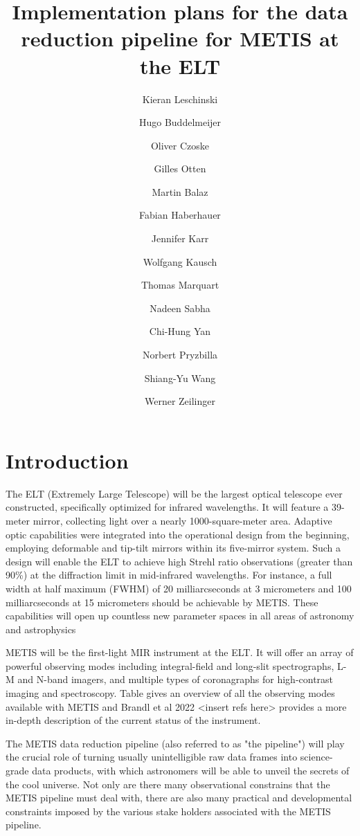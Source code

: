 \documentclass[a4paper]{spie}  %
\title{Implementation plans for the data reduction pipeline for METIS at the ELT}
\author[a]{Kieran Leschinski}
\author[a]{Hugo Buddelmeijer}
\author[a]{Oliver Czoske}
\author[b]{Gilles Otten}
\author[a]{Martin Balaz}
\author[a]{Fabian Haberhauer}
\author[b]{Jennifer Karr}
\author[c]{Wolfgang Kausch}
\author[d]{Thomas Marquart}
\author[c]{Nadeen Sabha}
\author[b]{Chi-Hung Yan}
\author[c]{Norbert Pryzbilla}
\author[b]{Shiang-Yu Wang}
\author[a]{Werner Zeilinger}
\affil[a]{University of Vienna, T\"urkenschanztra\ss e 18, 1180 Vienna, Austria}
\affil[b]{ASIAA, Taiwan}
\affil[c]{University of Innsbruck, Austria}
\affil[d]{University of Uppsala, Sweden}
\begin{document}
 
\maketitle

\begin{abstract}


\end{abstract}



\section{Introduction}
The ELT (Extremely Large Telescope) will be the largest optical telescope ever constructed, specifically optimized for infrared wavelengths. 
It will feature a 39-meter mirror, collecting light over a nearly 1000-square-meter area. 
Adaptive optic capabilities were integrated into the operational design from the beginning, employing deformable and tip-tilt mirrors within its five-mirror system. 
Such a design will enable the ELT to achieve high Strehl ratio observations (greater than 90\%) at the diffraction limit in mid-infrared wavelengths. 
For instance, a full width at half maximum (FWHM) of 20 milliarcseconds at 3 micrometers and 100 milliarcseconds at 15 micrometers should be achievable by METIS. 
These capabilities will open up countless new parameter spaces in all areas of astronomy and astrophysics


METIS will be the first-light MIR instrument at the ELT.
It will offer  an array of powerful observing modes including  integral-field and long-slit spectrographs, L-M and N-band imagers, and multiple types of coronagraphs for high-contrast imaging and spectroscopy.
Table gives an overview of all the observing modes available with METIS and Brandl et al 2022 <insert refs here> provides a more in-depth description of the current status of the instrument. 

The METIS data reduction pipeline (also referred to as  "the pipeline") will play the crucial role of turning usually unintelligible raw data frames into science-grade data products, with which astronomers will be able to unveil the secrets of the cool universe.
Not only are there many observational constrains that the METIS pipeline must deal with, there are also many practical and developmental constraints imposed by the various stake holders associated with the METIS pipeline.
\end{document}
